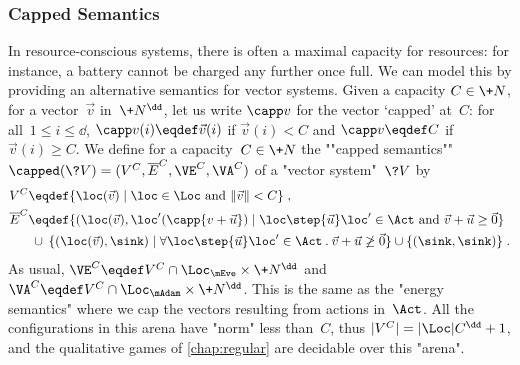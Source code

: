 \subsubsection{Capped Semantics}
\label{11-capping}

In resource-conscious systems, there is often a maximal capacity for
resources: for instance, a battery cannot be charged any further once
full.  We can model this by providing an alternative semantics
for vector systems.  Given a capacity $C\in\+N$, for a vector~$\vec v$
in~$\+N^\dd$, let us write $\capp v$ for the vector `capped' at~$C$:
for all~$1\leq i\leq\dd$, $\capp v(i)\eqdef\vec v(i)$ if $\vec v(i)<C$
and $\capp v\eqdef C$ if $\vec v(i)\geq C$.  We define for a
capacity~$C\in\+N$ the ""capped semantics""
$\capped(\?V)=(V^C,\overline{E}^C,\VE^C,\VA^C)$ of a "vector system"~$\?V$ by
\begin{align*}
  V^C&\eqdef\{\loc(\vec v)\mid\loc\in\Loc\text{ and }\|\vec v\|<C\}\;,\\
  \overline{E}^C&\eqdef \{(\loc(\vec v),\loc'(\capp{v+\vec u})\mid\loc\step{\vec
       u}\loc'\in\Act\text{ and }\vec v+\vec u\geq\vec 0\}\\
     &\:\cup\:\{(\loc(\vec v),\sink)\mid\forall\loc\step{\vec
               u}\loc'\in\Act\mathbin.\vec v+\vec u\not\geq\vec
               0\}
     \cup\{(\sink,\sink)\}\;.
\end{align*}
As usual, $\VE^C\eqdef V^C\cap\Loc_\mEve\times\+N^\dd$ and
$\VA^C\eqdef V^C\cap\Loc_\mAdam\times\+N^\dd$.  This is the same as
the "energy semantics" where we cap the vectors resulting from actions
in~$\Act$.  All the configurations in this arena have "norm" less
than~$C$, thus $|V^C|=|\Loc| C^\dd+1$, and the qualitative games of
\cref{chap:regular} are decidable over this "arena".


